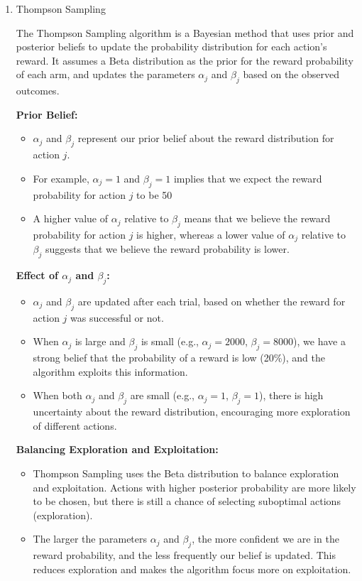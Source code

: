 \documentclass[11pt]{article}
\begin{document}
\begin{enumerate}[1.]
\item Thompson Sampling

The Thompson Sampling algorithm is a Bayesian method that uses prior and posterior beliefs to update the probability distribution for each action's reward. It assumes a Beta distribution as the prior for the reward probability of each arm, and updates the parameters \(\alpha_j\) and \(\beta_j\) based on the observed outcomes.

  \textbf{Prior Belief:}
    \begin{itemize}
        \item \(\alpha_j\) and \(\beta_j\) represent our prior belief about the reward distribution for action \(j\).
        \item For example, \(\alpha_j = 1\) and \(\beta_j = 1\) implies that we expect the reward probability for action \(j\) to be 50%
        \item A higher value of \(\alpha_j\) relative to \(\beta_j\) means that we believe the reward probability for action \(j\) is higher, whereas a lower value of \(\alpha_j\) relative to \(\beta_j\) suggests that we believe the reward probability is lower.
    \end{itemize}

  \textbf{Effect of \(\alpha_j\) and \(\beta_j\):}
    \begin{itemize}
        \item \(\alpha_j\) and \(\beta_j\) are updated after each trial, based on whether the reward for action \(j\) was successful or not.
        \item When \(\alpha_j\) is large and \(\beta_j\) is small (e.g., \(\alpha_j = 2000\), \(\beta_j = 8000\)), we have a strong belief that the probability of a reward is low (20\%), and the algorithm exploits this information.
        \item When both \(\alpha_j\) and \(\beta_j\) are small (e.g., \(\alpha_j = 1\), \(\beta_j = 1\)), there is high uncertainty about the reward distribution, encouraging more exploration of different actions.
    \end{itemize}

  \textbf{Balancing Exploration and Exploitation:}
    \begin{itemize}
        \item Thompson Sampling uses the Beta distribution to balance exploration and exploitation. Actions with higher posterior probability are more likely to be chosen, but there is still a chance of selecting suboptimal actions (exploration).
        \item The larger the parameters \(\alpha_j\) and \(\beta_j\), the more confident we are in the reward probability, and the less frequently our belief is updated. This reduces exploration and makes the algorithm focus more on exploitation.
    \end{itemize}
    

\end{enumerate}
\end{document}
